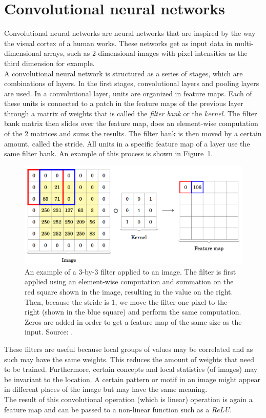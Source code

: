 \section{Convolutional neural networks}
Convolutional neural networks are neural networks that are inspired by the way the visual cortex of a human works.
These networks get as input data in multi-dimensional arrays, such as 2-dimensional images with pixel intensities as the third dimension for example.\\
A convolutional neural network is structured as a series of stages, which are combinations of layers.
In the first stages, convolutional layers and pooling layers are used.
In a convolutional layer, units are organized in feature maps.
Each of these units is connected to a patch in the feature maps of the previous layer through a matrix of weights that is called the \emph{filter bank} or the \textit{kernel}.
The filter bank matrix then slides over the feature map, does an element-wise computation of the 2 matrices and sums the results.
The filter bank is then moved by a certain amount, called the stride.
All units in a specific feature map of a layer use the same filter bank.
An example of this process is shown in Figure~\ref{fig:cnnfilter}.
\begin{figure}[htb]
    \centering
    \includegraphics[width=.8\linewidth]{images/cnnfilter.png}
    \caption[An example of a 3-by-3 filter applied to an image]{An example of a 3-by-3 filter applied to an image. The filter is first applied using an element-wise computation and summation on the red square shown in the image, resulting in the value on the right. Then, because the stride is $1$, we move the filter one pixel to the right (shown in the blue square) and perform the same computation. Zeros are added in order to get a feature map of the same size as the input. Source: \cite{pavlovsky2017}.}
    \label{fig:cnnfilter}
\end{figure}

These filters are useful because local groups of values may be correlated and as such may have the same weights. This reduces the amount of weights that need to be trained. Furthermore, certain concepts and local statistics (of images) may be invariant to the location. A certain pattern or motif in an image might appear in different places of the image but may have the same meaning.\\
The result of this convolutional operation (which is linear) operation is again a feature map and can be passed to a non-linear function such as a \textit{ReLU}.\\

